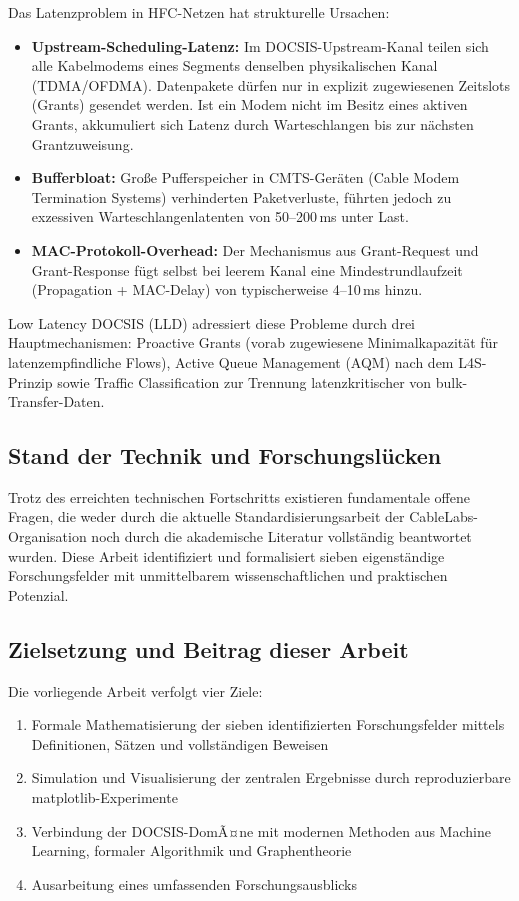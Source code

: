 ﻿\documentclass[a4paper,12pt]{article}
\theoremstyle{definition}
\begin{document}
Das Latenzproblem in HFC-Netzen hat strukturelle Ursachen:
\begin{itemize}
    \item \textbf{Upstream-Scheduling-Latenz:} Im DOCSIS-Upstream-Kanal teilen sich
          alle Kabelmodems eines Segments denselben physikalischen Kanal (TDMA/OFDMA).
          Datenpakete d\"{u}rfen nur in explizit zugewiesenen Zeitslots (Grants) gesendet
          werden. Ist ein Modem nicht im Besitz eines aktiven Grants, akkumuliert sich
          Latenz durch Warteschlangen bis zur n\"{a}chsten Grantzuweisung.
    \item \textbf{Bufferbloat:} Gro{\ss}e Pufferspeicher in CMTS-Ger\"{a}ten (Cable Modem
          Termination Systems) verhinderten Paketverluste, f\"{u}hrten jedoch zu exzessiven
          Warteschlangenlatenten von 50--200\,ms unter Last.
    \item \textbf{MAC-Protokoll-Overhead:} Der Mechanismus aus Grant-Request und
          Grant-Response f\"{u}gt selbst bei leerem Kanal eine Mindestrundlaufzeit
          (Propagation + MAC-Delay) von typischerweise 4--10\,ms hinzu.
\end{itemize}

Low Latency DOCSIS (LLD) adressiert diese Probleme durch drei Hauptmechanismen:
Proactive Grants (vorab zugewiesene Minimalkapazit\"{a}t f\"{u}r latenzempfindliche Flows),
Active Queue Management (AQM) nach dem L4S-Prinzip \cite{briscoe2023l4s} sowie
Traffic Classification zur Trennung latenzkritischer von bulk-Transfer-Daten.

\subsection{Stand der Technik und Forschungsl\"{u}cken}

Trotz des erreichten technischen Fortschritts existieren fundamentale offene
Fragen, die weder durch die aktuelle Standardisierungsarbeit der
CableLabs-Organisation noch durch die akademische Literatur vollst\"{a}ndig
beantwortet wurden. Diese Arbeit identifiziert und formalisiert sieben
eigenst\"{a}ndige Forschungsfelder mit unmittelbarem wissenschaftlichen und
praktischen Potenzial.

\subsection{Zielsetzung und Beitrag dieser Arbeit}

Die vorliegende Arbeit verfolgt vier Ziele:
\begin{enumerate}
    \item Formale Mathematisierung der sieben identifizierten Forschungsfelder
          mittels Definitionen, S\"{a}tzen und vollst\"{a}ndigen Beweisen
    \item Simulation und Visualisierung der zentralen Ergebnisse durch
          reproduzierbare matplotlib-Experimente
    \item Verbindung der DOCSIS-DomÃ¤ne mit modernen Methoden aus Machine Learning,
          formaler Algorithmik und Graphentheorie
    \item Ausarbeitung eines umfassenden Forschungsausblicks
\end{enumerate}
\end{document}
